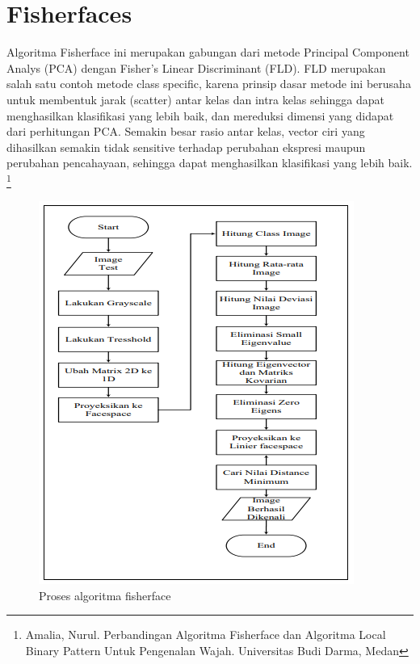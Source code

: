 \newpage
\section{Fisherfaces}
Algoritma Fisherface ini merupakan gabungan dari metode Principal Component Analys (PCA) dengan Fisher’s Linear Discriminant (FLD). FLD merupakan salah satu contoh metode class specific, 
karena prinsip dasar metode ini berusaha untuk membentuk jarak (scatter) antar kelas dan intra kelas sehingga dapat menghasilkan klasifikasi yang lebih baik, dan mereduksi dimensi yang didapat dari perhitungan PCA. 
Semakin besar rasio antar kelas, vector ciri yang dihasilkan semakin tidak sensitive terhadap perubahan ekspresi maupun perubahan pencahayaan, sehingga dapat menghasilkan klasifikasi yang lebih baik. 
\footnote{Amalia, Nurul. Perbandingan Algoritma Fisherface dan Algoritma Local Binary Pattern Untuk Pengenalan Wajah. Universitas Budi Darma, Medan}
\begin{figure}[h!]
    \centering
    \includegraphics[width=0.7\linewidth]{images/algoritma_fisherface.PNG}
    \caption{Proses algoritma fisherface}
\end{figure}